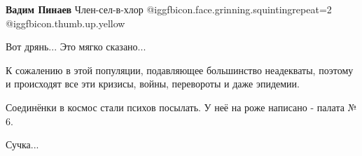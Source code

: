 \begin{itemize}
\begin{itemize}
\textbf{Вадим Пинаев}
Член-сел-в-хлор  @igg{fbicon.face.grinning.squinting}{repeat=2}  @igg{fbicon.thumb.up.yellow} 
\end{itemize} %

Вот дрянь... Это мягко сказано...


К сожалению в этой популяции, подавляющее большинство неадекваты, поэтому и
происходят все эти кризисы, войны, перевороты и даже эпидемии.


Соединёнки в космос стали психов посылать. У неё на роже написано - палата № 6.

Сучка...


\end{itemize} %
